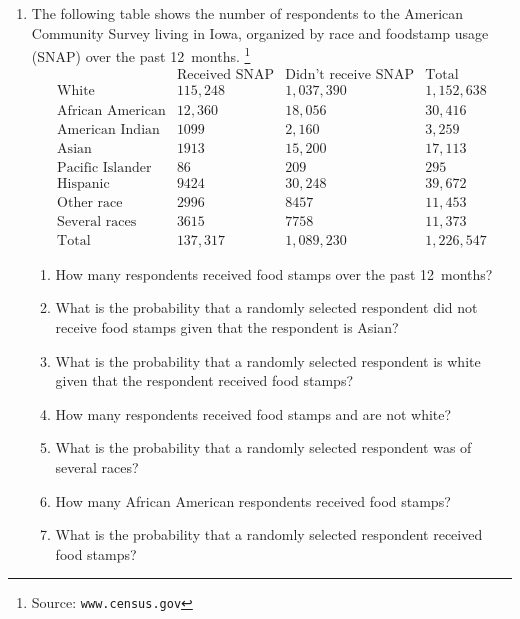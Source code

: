 \documentclass[12pt]{article}
\begin{document}
\begin{enumerate}
\item The following table shows the number
of respondents to the American Community
Survey living in Iowa,
organized by race and foodstamp usage (SNAP) over the past 12~months.
\footnote{Source: \tt www.census.gov}
\[\begin{array}{l|rr|r}
&\text{Received SNAP}&\text{Didn't receive SNAP}
&\text{Total}\\\hline
\text{White}&115,248&1,037,390&1,152,638\\
\text{African American}&12,360&18,056&30,416\\
\text{American Indian}&1099&2,160&3,259\\
\text{Asian}&1913&15,200&17,113\\
\text{Pacific Islander}&86&209&295\\
\text{Hispanic}&9424&30,248&39,672\\
\text{Other race}&2996&8457&11,453\\
\text{Several races}&3615&7758&11,373\\\hline
\text{Total}&137,317&1,089,230&1,226,547
\end{array}\]
\begin{enumerate}
\item How many respondents received food stamps over the
past 12~months?
\item What is the probability that a randomly selected
respondent did not receive food stamps given that
the respondent is Asian?
\item What is the probability that a randomly selected
respondent is white given that the respondent
received food stamps?
\item How many respondents received food stamps and
are not white?
\item What is the probability that a randomly selected
respondent was of several races?
\item How many African American respondents received
food stamps?
\item What is the probability that a randomly selected
respondent received food stamps?
\end{enumerate}


\end{enumerate}
\end{document}
